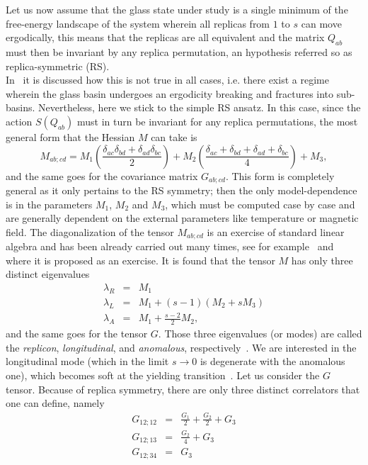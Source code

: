 \documentclass[aps,pnas,float]{revtex4}
\begin{document}
Let us now assume that the glass state under study is a single minimum of the free-energy landscape of the system wherein all replicas from $1$ to $s$ can move ergodically, this means that the replicas are all equivalent and the matrix $Q_{ab}$ must then be invariant by any replica permutation, an hypothesis referred so as replica-symmetric (RS).\\
In~\cite{RUYZ15} it is discussed how this is not true in all cases, i.e. there exist a regime wherein the glass basin undergoes an ergodicity breaking and fractures into sub-basins. Nevertheless, here we stick to the simple RS ansatz. In this case, since the action $S(Q_{ab})$ must in turn be invariant for any replica permutations, the most general form that the Hessian $M$ can take is
\begin{equation}
 M_{ab;cd} = M_1 \left(\frac{\delta_{ac}\delta_{bd} + \delta_{ad}\delta_{bc}}{2}\right) + M_2 \left(\frac{\delta_{ac} +\delta_{bd} + \delta_{ad} +\delta_{bc}}{4}\right) + M_3,
\end{equation}
and the same goes for the covariance matrix $G_{ab;cd}$. This form is completely general as it only pertains to the RS symmetry; then the only model-dependence is in the parameters $M_1$, $M_2$ and $M_3$, which must be computed case by case and are generally dependent on the external parameters like temperature or magnetic field.
The diagonalization of the tensor $M_{ab;cd}$ is an exercise of standard linear algebra and has been already carried out many times, see for example~\cite{CS92,BM79,DK98} and~\cite{Z10} where it is proposed as an exercise. It is found that the tensor $M$ has only three distinct eigenvalues
\begin{eqnarray}
 \lambda_R &=& M_1\\
 \lambda_L &=& M_1 + (s-1)(M_2+sM_3)\\
 \lambda_A &=& M_1 + \frac{s-2}{2}M_2,
\end{eqnarray}
and the same goes for the tensor $G$. Those three eigenvalues (or modes) are called the \emph{replicon}, \emph{longitudinal}, and \emph{anomalous}, respectively~\cite{Z10}.
We are interested in the longitudinal mode (which in the limit $s\to 0$ is degenerate with the anomalous one), which becomes soft at the yielding transition~\cite{RU16,UZ16}. Let us consider the $G$ tensor. Because of replica symmetry, there are only three distinct correlators that one can define, namely
\begin{eqnarray}
 G_{12;12} &=& \frac{G_1}{2} + \frac{G_2}{2} + G_3\\
 G_{12;13} &=& \frac{G_2}{4} + G_3\\
 G_{12;34} &=& G_3
\end{eqnarray}
\end{document}
